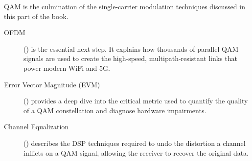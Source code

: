 \begin{importantbox}[title={Further Reading}]
    QAM is the culmination of the single-carrier modulation techniques discussed in this part of the book.
    \begin{description}
        \item[OFDM] () is the essential next step. It explains how thousands of parallel QAM signals are used to create the high-speed, multipath-resistant links that power modern WiFi and 5G.
        \item[Error Vector Magnitude (EVM)] () provides a deep dive into the critical metric used to quantify the quality of a QAM constellation and diagnose hardware impairments.
        \item[Channel Equalization] () describes the DSP techniques required to undo the distortion a channel inflicts on a QAM signal, allowing the receiver to recover the original data.
    \end{description}
\end{importantbox}
